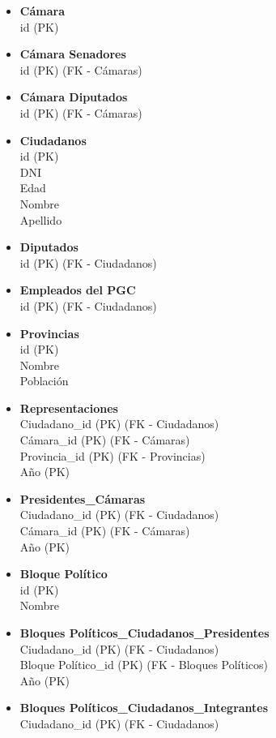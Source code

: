 \begin{itemize}
	\item \textbf{Cámara} \\
	id (PK)
	\item \textbf{Cámara Senadores} \\
	id (PK) (FK - Cámaras)
	\item \textbf{Cámara Diputados} \\
	id (PK) (FK - Cámaras)
	\item \textbf{Ciudadanos} \\
	id (PK) \\
	DNI \\
	Edad \\
	Nombre \\
	Apellido
	\item \textbf{Diputados} \\
	id (PK) (FK - Ciudadanos)
	\item \textbf{Empleados del PGC} \\
	id (PK) (FK - Ciudadanos)
	\item \textbf{Provincias} \\
	id (PK) \\
	Nombre \\
	Población
	\item \textbf{Representaciones} \\
	Ciudadano\_id (PK) (FK - Ciudadanos) \\
	Cámara\_id (PK) (FK - Cámaras) \\
	Provincia\_id (PK) (FK - Provincias) \\
	Año (PK) 
	\item \textbf{Presidentes\_Cámaras} \\
	Ciudadano\_id (PK) (FK - Ciudadanos)\\
	Cámara\_id (PK) (FK - Cámaras) \\
	Año (PK)
	\item \textbf{Bloque Político} \\
	id (PK) \\
	Nombre
	\item \textbf{Bloques Políticos\_Ciudadanos\_Presidentes} \\
	Ciudadano\_id (PK) (FK - Ciudadanos) \\
	Bloque Político\_id (PK) (FK - Bloques Políticos)\\
	Año (PK)
	\item \textbf{Bloques Políticos\_Ciudadanos\_Integrantes} \\
	Ciudadano\_id (PK) (FK - Ciudadanos) \\

\end{itemize}
